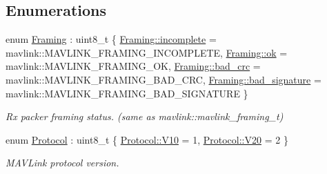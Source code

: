 \subsection*{Enumerations}
\begin{DoxyCompactItemize}
\item 
enum \mbox{\hyperlink{group__mavconn_gac93e6f8262bcc6008b4882ae6213f494}{Framing}} \+: uint8\+\_\+t \{ \mbox{\hyperlink{group__mavconn_ggac93e6f8262bcc6008b4882ae6213f494a5ed4e9858ad8d239145ef285b6210a00}{Framing\+::incomplete}} = mavlink\+::M\+A\+V\+L\+I\+N\+K\+\_\+\+F\+R\+A\+M\+I\+N\+G\+\_\+\+I\+N\+C\+O\+M\+P\+L\+E\+TE, 
\mbox{\hyperlink{group__mavconn_ggac93e6f8262bcc6008b4882ae6213f494a444bcb3a3fcf8389296c49467f27e1d6}{Framing\+::ok}} = mavlink\+::M\+A\+V\+L\+I\+N\+K\+\_\+\+F\+R\+A\+M\+I\+N\+G\+\_\+\+OK, 
\mbox{\hyperlink{group__mavconn_ggac93e6f8262bcc6008b4882ae6213f494abaf1c3d199daf5f5b444664b81a08749}{Framing\+::bad\+\_\+crc}} = mavlink\+::M\+A\+V\+L\+I\+N\+K\+\_\+\+F\+R\+A\+M\+I\+N\+G\+\_\+\+B\+A\+D\+\_\+\+C\+RC, 
\mbox{\hyperlink{group__mavconn_ggac93e6f8262bcc6008b4882ae6213f494adbfa03ea5df0b8979551ed84f97018e9}{Framing\+::bad\+\_\+signature}} = mavlink\+::M\+A\+V\+L\+I\+N\+K\+\_\+\+F\+R\+A\+M\+I\+N\+G\+\_\+\+B\+A\+D\+\_\+\+S\+I\+G\+N\+A\+T\+U\+RE
 \}
\begin{DoxyCompactList}\small\item\em Rx packer framing status. (same as {\ttfamily mavlink\+::mavlink\+\_\+framing\+\_\+t}) \end{DoxyCompactList}\item 
enum \mbox{\hyperlink{group__mavconn_gae4e5498ebfd232dcad75be0f8a168ff3}{Protocol}} \+: uint8\+\_\+t \{ \mbox{\hyperlink{group__mavconn_ggae4e5498ebfd232dcad75be0f8a168ff3a3ffc64fa10df9a884ba82f3e49e8282e}{Protocol\+::\+V10}} = 1, 
\mbox{\hyperlink{group__mavconn_ggae4e5498ebfd232dcad75be0f8a168ff3aba9161e2ae9f747e361fa824ca0d0337}{Protocol\+::\+V20}} = 2
 \}
\begin{DoxyCompactList}\small\item\em M\+A\+V\+Link protocol version. \end{DoxyCompactList}\end{DoxyCompactItemize}
